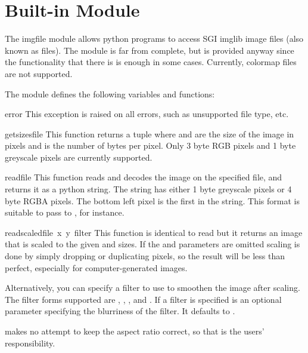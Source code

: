 \section{Built-in Module }

The imgfile module allows python programs to access SGI imglib image
files (also known as  files).  The module is far from
complete, but is provided anyway since the functionality that there is
is enough in some cases.  Currently, colormap files are not supported.

The module defines the following variables and functions:

\renewcommand{\indexsubitem}{(in module imgfile)}
\begin{excdesc}{error}
This exception is raised on all errors, such as unsupported file type, etc.
\end{excdesc}

\begin{funcdesc}{getsizes}{file}
This function returns a tuple  where
 and  are the size of the image in pixels and
 is the number of
bytes per pixel. Only 3 byte RGB pixels and 1 byte greyscale pixels
are currently supported.
\end{funcdesc}

\begin{funcdesc}{read}{file}
This function reads and decodes the image on the specified file, and
returns it as a python string. The string has either 1 byte greyscale
pixels or 4 byte RGBA pixels. The bottom left pixel is the first in
the string. This format is suitable to pass to ,
for instance.
\end{funcdesc}

\begin{funcdesc}{readscaled}{file\, x\, y\, filter}
This function is identical to read but it returns an image that is
scaled to the given  and  sizes. If the  and
 parameters are omitted scaling is done by
simply dropping or duplicating pixels, so the result will be less than
perfect, especially for computer-generated images.

Alternatively, you can specify a filter to use to smoothen the image
after scaling. The filter forms supported are ,
, ,  and
. If a filter is specified  is an optional
parameter specifying the blurriness of the filter. It defaults to .

 makes no
attempt to keep the aspect ratio correct, so that is the users'
responsibility.
\end{funcdesc}

